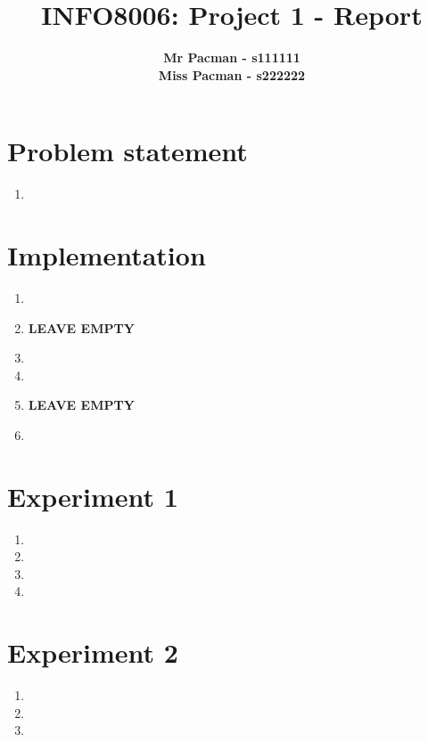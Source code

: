 \documentclass{article}
\begin{document}

\title{\Large{INFO8006: Project 1 - Report}}
\vspace{1cm}
\author{\small{\bf Mr Pacman - s111111} \\ \small{\bf Miss Pacman - s222222}}

\maketitle


\section{Problem statement}

\begin{enumerate}[label=\alph*.]
    \item
\end{enumerate}

\section{Implementation}

\begin{enumerate}[label=\alph*.]
    \item
    \item \textbf{LEAVE EMPTY}
    \item
    \item
    \item \textbf{LEAVE EMPTY}
    \item
\end{enumerate}

\section{Experiment 1}

\begin{enumerate}[label=\alph*.]
    \item
    \item
    \item
    \item
\end{enumerate}

\section{Experiment 2}

\begin{enumerate}[label=\alph*.]
    \item
    \item
    \item
\end{enumerate}


\end{document}
